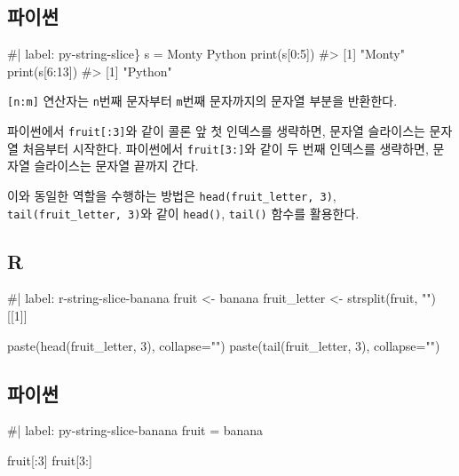 \documentclass[
  letterpaper,
]{book}
\newenvironment{Shaded}{\begin{snugshade}}{\end{snugshade}}
\newcommand{\NormalTok}[1]{\textcolor[rgb]{0.00,0.23,0.31}{#1}}
\begin{document}
\subsection{파이썬}

\begin{Shaded}
\begin{Highlighting}[]
\NormalTok{\#| label: py{-}string{-}slice\}}
\NormalTok{s = \textquotesingle{}Monty Python\textquotesingle{}}
\NormalTok{print(s[0:5])}
\NormalTok{\#\textgreater{} [1] "Monty"}
\NormalTok{print(s[6:13])}
\NormalTok{\#\textgreater{} [1] "Python"}
\end{Highlighting}
\end{Shaded}

\texttt{{[}n:m{]}} 연산자는 \texttt{n}번째 문자부터 \texttt{m}번째
문자까지의 문자열 부분을 반환한다.

파이썬에서 \texttt{fruit{[}:3{]}}와 같이 콜론 앞 첫 인덱스를 생략하면,
문자열 슬라이스는 문자열 처음부터 시작한다. 파이썬에서
\texttt{fruit{[}3:{]}}와 같이 두 번째 인덱스를 생략하면, 문자열
슬라이스는 문자열 끝까지 간다.

이와 동일한 역할을 수행하는 방법은 \texttt{head(fruit\_letter,\ 3)},
\texttt{tail(fruit\_letter,\ 3)}와 같이 \texttt{head()}, \texttt{tail()}
함수를 활용한다.

\subsection{R}

\begin{Shaded}
\begin{Highlighting}[]
\NormalTok{\#| label: r{-}string{-}slice{-}banana}
\NormalTok{fruit \textless{}{-} \textquotesingle{}banana\textquotesingle{}}
\NormalTok{fruit\_letter \textless{}{-} strsplit(fruit, "")[[1]]}

\NormalTok{paste(head(fruit\_letter, 3), collapse="")}
\NormalTok{paste(tail(fruit\_letter, 3), collapse="")}
\end{Highlighting}
\end{Shaded}

\subsection{파이썬}

\begin{Shaded}
\begin{Highlighting}[]
\NormalTok{\#| label: py{-}string{-}slice{-}banana}
\NormalTok{fruit = \textquotesingle{}banana\textquotesingle{}}

\NormalTok{fruit[:3]}
\NormalTok{fruit[3:]}
\end{Highlighting}
\end{Shaded}
\end{document}
